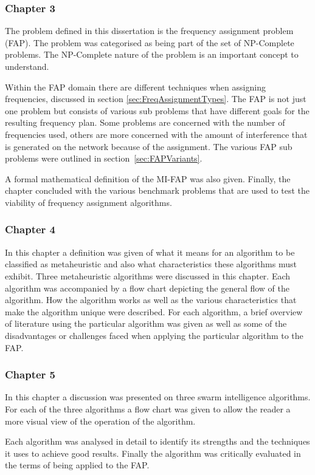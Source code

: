 \subsubsection{Chapter 3}
The problem defined in this dissertation is the frequency assignment problem (FAP). The problem was categorised as being part of the set of NP-Complete problems. The NP-Complete nature of the problem is an important concept to understand.

Within the FAP domain there are different techniques when assigning frequencies, discussed in section \ref{sec:FreqAssignmentTypes}.
The FAP is not just one problem but consists of various sub problems that have different goals for the resulting frequency plan. Some problems are concerned with the number of frequencies used, others are more concerned with the amount of interference that is generated on the network because of the assignment. The various FAP sub problems were outlined in section~\ref{sec:FAPVariants}.

A formal mathematical definition of the MI-FAP was also given. Finally, the chapter concluded with the various benchmark problems that are used to test the viability of frequency assignment algorithms.
\subsubsection{Chapter 4}
In this chapter a definition was given of what it means for an algorithm to be classified as metaheuristic and also what characteristics these algorithms must exhibit.
Three metaheuristic algorithms were discussed in this chapter. Each algorithm was accompanied by a flow chart depicting the general flow of the algorithm. How the algorithm works as well as the various characteristics that make the algorithm unique were described.
For each algorithm, a brief overview of literature using the particular algorithm was given as well as some of the disadvantages or challenges faced when applying the particular algorithm to the FAP.

\subsubsection{Chapter 5}
In this chapter a discussion was presented on three swarm intelligence algorithms. For each of the three algorithms a flow chart was given to allow the reader a more visual view of the operation of the algorithm. 

Each algorithm was analysed in detail to identify its strengths and the techniques it uses to achieve good results. Finally the algorithm was critically evaluated in the terms of being applied to the FAP.
